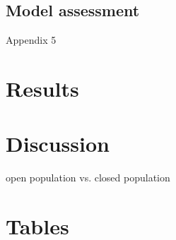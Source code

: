 \documentclass{article}
\begin{document}
\subsection{Model assessment}

Appendix 5


\section{Results}

\section{Discussion}

open population vs. closed population

\newpage

\section{Tables}

\renewcommand{\arraystretch}{1.25}
\end{document}
